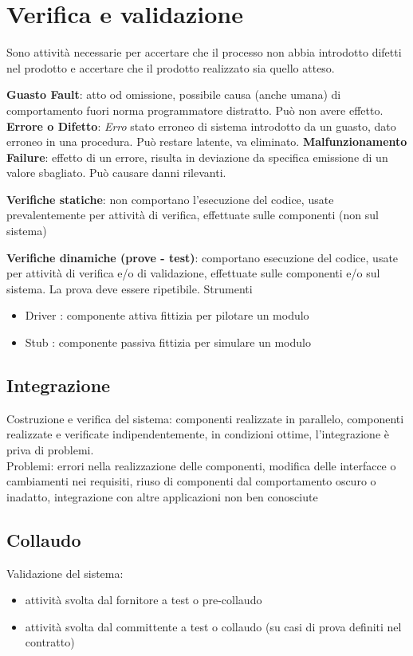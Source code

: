 \section{Verifica e validazione}
Sono attività necessarie per accertare che il processo non abbia introdotto difetti nel prodotto e accertare che il prodotto realizzato sia quello atteso.
\begin{itemize}
\textbf{Guasto Fault}: atto od omissione, possibile causa (anche umana) di comportamento fuori norma programmatore distratto. Può non avere effetto.
\textbf{Errore o Difetto}: \textit{Erro} stato erroneo di sistema introdotto da un guasto, dato erroneo in una procedura. Può restare latente, va eliminato.
\textbf{Malfunzionamento Failure}: effetto di un errore, risulta in deviazione da specifica emissione di un valore sbagliato. Può causare danni rilevanti.
\end{itemize}

\textbf{Verifiche statiche}: non comportano l'esecuzione del codice, usate prevalentemente per attività di verifica, effettuate sulle componenti (non sul sistema)

\textbf{Verifiche dinamiche (prove - test)}: comportano esecuzione del codice, usate per attività di verifica e/o di validazione, effettuate sulle componenti e/o sul sistema. La prova deve essere ripetibile.
Strumenti
\begin{itemize}
\item Driver : componente attiva fittizia per pilotare un modulo
\item Stub : componente passiva fittizia per simulare un modulo
\end{itemize}

\subsection{Integrazione}
Costruzione e verifica del sistema: componenti realizzate in parallelo, componenti realizzate e verificate indipendentemente, in condizioni ottime, l'integrazione è priva di problemi.\\
Problemi: errori nella realizzazione delle componenti, modifica delle interfacce o cambiamenti nei requisiti, riuso di componenti dal comportamento oscuro o inadatto, integrazione con altre applicazioni non ben conosciute
\subsection{Collaudo}
Validazione del sistema:
\begin{itemize}
\item attività svolta dal fornitore a test o pre-collaudo
\item attività svolta dal committente a test o collaudo (su casi di prova definiti nel contratto)
\end{itemize}

